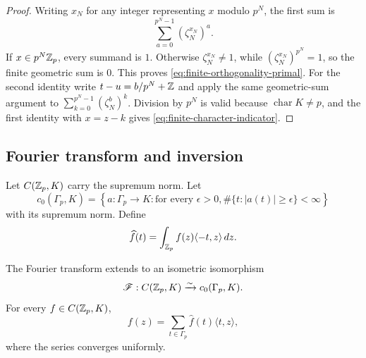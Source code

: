 \begin{proof}
Writing $x_N$ for any integer representing $x$ modulo $p^N$, the first sum
is
\[
 \sum_{a=0}^{p^N-1}(\zeta_N^{x_N})^a.
\]
If $x\in p^N\mathbb Z_p$, every summand is $1$.  Otherwise
$\zeta_N^{x_N}\ne1$, while $(\zeta_N^{x_N})^{p^N}=1$, so the finite
geometric sum is $0$.  This proves
\cref{eq:finite-orthogonality-primal}.  For the second identity write
$t-u=b/p^N+\mathbb Z$ and apply the same geometric-sum argument to
$\sum_{k=0}^{p^N-1}(\zeta_N^b)^k$.  Division by $p^N$ is valid because
$\operatorname{char}K\ne p$, and the first identity with $x=z-k$ gives
\cref{eq:finite-character-indicator}.
\end{proof}

\subsection{Fourier transform and inversion}

Let $C(\mathbb Z_p,K)$ carry the supremum norm.  Let
\[
 c_0(\Gamma_p,K)=\left\{a:\Gamma_p\to K:
 \text{for every }\epsilon>0,
 \#\{t:|a(t)|\geq\epsilon\}<\infty\right\}
\]
with its supremum norm.  Define
\begin{equation}
\label{eq:pq-Fourier}
 \widehat f(t)=\int_{\mathbb Z_p}f(z)\langle-t,z\rangle\,dz.
\end{equation}

\begin{theorem}
\label{thm:pq-Fourier-isometry}
The Fourier transform extends to an isometric isomorphism
\begin{equation}
\label{eq:Fourier-isometry}
 \mathscr F:C(\mathbb Z_p,K)\xrightarrow{\sim}c_0(\Gamma_p,K).
\end{equation}
For every $f\in C(\mathbb Z_p,K)$,
\begin{equation}
\label{eq:pq-Fourier-inversion}
 f(z)=\sum_{t\in\Gamma_p}\widehat f(t)\langle t,z\rangle,
\end{equation}
where the series converges uniformly.
\end{theorem}

